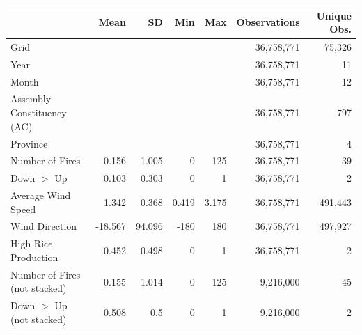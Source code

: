 \begin{tabular}{lrrrrrr}
\toprule
 & Mean & SD & Min & Max & Observations & Unique Obs.\\
\midrule
Grid &  &  &  &  & 36,758,771 & 75,326\\
Year &  &  &  &  & 36,758,771 & 11\\
Month &  &  &  &  & 36,758,771 & 12\\
Assembly Constituency (AC) &  &  &  &  & 36,758,771 & 797\\
Province &  &  &  &  & 36,758,771 & 4\\
Number of Fires & 0.156 & 1.005 & 0 & 125 & 36,758,771 & 39\\
Down $>$ Up & 0.103 & 0.303 & 0 & 1 & 36,758,771 & 2\\
Average Wind Speed & 1.342 & 0.368 & 0.419 & 3.175 & 36,758,771 & 491,443\\
Wind Direction & -18.567 & 94.096 & -180 & 180 & 36,758,771 & 497,927\\
High Rice Production & 0.452 & 0.498 & 0 & 1 & 36,758,771 & 2\\
\midrule
Number of Fires (not stacked) & 0.155 & 1.014 & 0 & 125 & 9,216,000 & 45\\
Down $>$ Up (not stacked) & 0.508 & 0.5 & 0 & 1 & 9,216,000 & 2\\
\bottomrule
\end{tabular}
